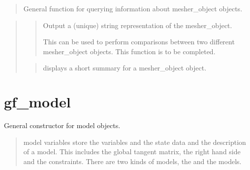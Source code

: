 \documentclass[a4paper,11pt,english]{sphinxmanual}
\begin{document}
\begin{quote}

General function for querying information about mesher\_object objects.
\end{quote}

\begin{quote}

\begin{quote}

Output a (unique) string representation of the mesher\_object.

This can be used to perform comparisons between two
different mesher\_object objects.
This function is to be completed.
\end{quote}

\begin{quote}

displays a short summary for a mesher\_object object.
\end{quote}
\end{quote}


\section{gf\_model}
\label{\detokenize{matlab_octave/cmdref_gf_model:gf-model}}\label{\detokenize{matlab_octave/cmdref_gf_model::doc}}

\begin{sphinxVerbatim}[commandchars=\\\{\}]
  
  
\end{sphinxVerbatim}


General constructor for model objects.
\begin{quote}

model variables store the variables and the state data and the
description of a model. This includes the global tangent matrix, the right
hand side and the constraints. There are two kinds of models, the 
and the  models.
\end{quote}
\end{document}
